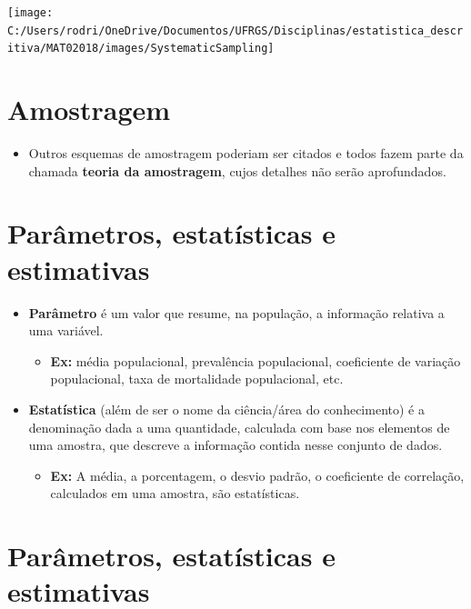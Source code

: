\documentclass[]{tufte-book}
\providecommand{\tightlist}{%
  \setlength{\itemsep}{0pt}\setlength{\parskip}{0pt}}
\begin{document}
\begin{center}\texttt{[image: C:/Users/rodri/OneDrive/Documentos/UFRGS/Disciplinas/estatistica\_descritiva/MAT02018/images/SystematicSampling]} \end{center}

\hypertarget{amostragem-1}{%
\section{Amostragem}\label{amostragem-1}}

\begin{itemize}
\tightlist
\item
  Outros esquemas de amostragem poderiam ser citados e todos fazem parte
  da chamada \textbf{teoria da amostragem}, cujos detalhes não serão
  aprofundados.
\end{itemize}

\hypertarget{paruxe2metros-estatuxedsticas-e-estimativas}{%
\section{Parâmetros, estatísticas e
estimativas}\label{paruxe2metros-estatuxedsticas-e-estimativas}}

\begin{itemize}
\tightlist
\item
  \textbf{Parâmetro} é um valor que resume, na população, a informação
  relativa a uma variável.

  \begin{itemize}
  \tightlist
  \item
    \textbf{Ex:} média populacional, prevalência populacional,
    coeficiente de variação populacional, taxa de mortalidade
    populacional, etc.
  \end{itemize}
\item
  \textbf{Estatística} (além de ser o nome da ciência/área do
  conhecimento) é a denominação dada a uma quantidade, calculada com
  base nos elementos de uma amostra, que descreve a informação contida
  nesse conjunto de dados.

  \begin{itemize}
  \tightlist
  \item
    \textbf{Ex:} A média, a porcentagem, o desvio padrão, o coeficiente
    de correlação, calculados em uma amostra, são estatísticas.
  \end{itemize}
\end{itemize}

\hypertarget{paruxe2metros-estatuxedsticas-e-estimativas-1}{%
\section{Parâmetros, estatísticas e
estimativas}\label{paruxe2metros-estatuxedsticas-e-estimativas-1}}
\end{document}
